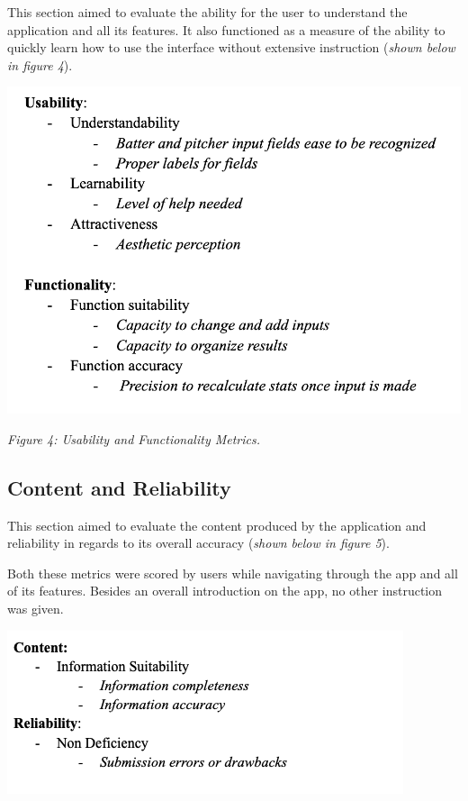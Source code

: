 \documentclass[10pt,twocolumn]{article}
\begin{document}
This section aimed to evaluate the ability for the user to understand the application and all its features. It also functioned as a measure of the ability to quickly learn how to use the interface without extensive instruction (\textit{shown below in figure 4}).

\includegraphics[scale=0.50]{images/usability.png}

\textit{Figure 4: Usability and Functionality Metrics.}

\subsection{Content and Reliability}

This section aimed to evaluate the content produced by the application and reliability in regards to its overall accuracy (\textit{shown below in figure 5}).

Both these metrics were scored by users while navigating through the app and all of its features. Besides an overall introduction on the app, no other instruction was given. 

\includegraphics[scale=0.50]{images/Screen Shot 2023-12-14 at 7.57.28 PM.png}
\end{document}
